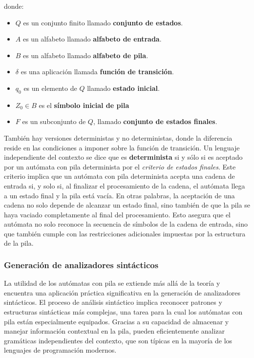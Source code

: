 \noindent
donde:
\begin{itemize}
    \item $Q$ es un conjunto finito llamado \textbf{conjunto de estados}.
    \item $A$ es un alfabeto llamado \textbf{alfabeto de entrada}.
    \item $B$ es un alfabeto llamado \textbf{alfabeto de pila}.
    \item $\delta$ es una aplicación llamada \textbf{función de transición}.
    \item $q_0$ es un elemento de $Q$ llamado \textbf{estado inicial}.
    \item $Z_0 \in B$ es el \textbf{símbolo inicial de pila}
    \item $F$ es un subconjunto de $Q$, llamado \textbf{conjunto de estados finales}.
\end{itemize}

También hay versiones deterministas y no deterministas, donde la diferencia reside en las condiciones a imponer sobre la función de transición. Un lenguaje independiente del contexto se dice que es \textbf{determinista} si y sólo si es aceptado por un autómata con pila determinista por el \textit{criterio de estados finales}. Este criterio implica que un autómata con pila determinista acepta una cadena de entrada si, y solo si, al finalizar el procesamiento de la cadena, el autómata llega a un estado final y la pila está vacía. En otras palabras, la aceptación de una cadena no solo depende de alcanzar un estado final, sino también de que la pila se haya vaciado completamente al final del procesamiento. Esto asegura que el autómata no solo reconoce la secuencia de símbolos de la cadena de entrada, sino que también cumple con las restricciones adicionales impuestas por la estructura de la pila.

\subsubsection{Generación de analizadores sintácticos}\label{subsubsection:analizadoresyntax}
La utilidad de los autómatas con pila se extiende más allá de la teoría y encuentra una aplicación práctica significativa en la generación de analizadores sintácticos. El proceso de análisis sintáctico implica reconocer patrones y estructuras sintácticas más complejas, una tarea para la cual los autómatas con pila están especialmente equipados. Gracias a su capacidad de almacenar y manejar información contextual en la pila, pueden eficientemente analizar gramáticas independientes del contexto, que son típicas en la mayoría de los lenguajes de programación modernos.

